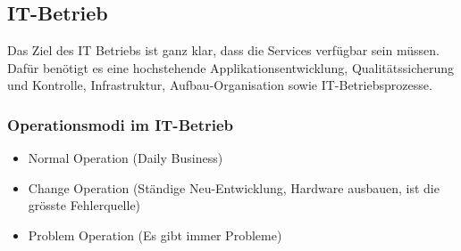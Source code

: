 \subsection{IT-Betrieb}
Das Ziel des IT Betriebs ist ganz klar, dass die Services verfügbar sein müssen. Dafür benötigt es eine hochstehende Applikationsentwicklung, Qualitätssicherung und Kontrolle, Infrastruktur, Aufbau-Organisation sowie IT-Betriebsprozesse.

\subsubsection{Operationsmodi im IT-Betrieb}
\begin{itemize}
	\item Normal Operation (Daily Business)
	\item Change Operation (Ständige Neu-Entwicklung, Hardware ausbauen, ist die grösste Fehlerquelle)
	\item Problem Operation (Es gibt immer Probleme)
\end{itemize}

